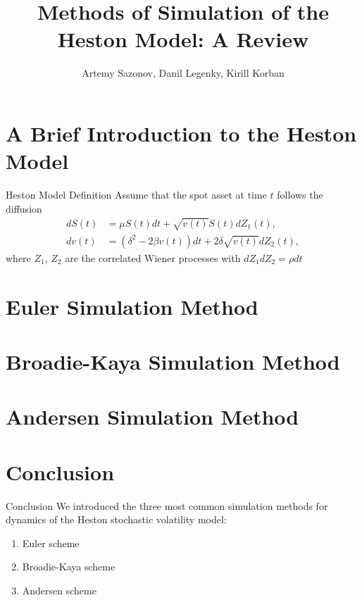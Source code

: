 \documentclass{vegapresentation}
\title{Methods of Simulation of the Heston Model: A Review}
\author{Artemy Sazonov, Danil Legenky, Kirill Korban}
\institute{Lomonosov Moscow State Univesity, Faculty of Mechanics and Mathematics}
\begin{document}
    \begin{frame}
        \maketitle
    \end{frame}

    \section{A Brief Introduction to the Heston Model}
        \begin{frame}{Heston Model Definition}
            Assume that the spot asset at time $t$ follows the diffusion
            \begin{align}
                dS(t) & = \mu S(t)dt + \sqrt{v(t)} S(t) dZ_1(t), \label{Heston:price}\\
                dv(t) & = \left(\delta^2 - 2\beta v(t)\right) dt + 2\delta \sqrt{v(t)} dZ_2(t), \label{Heston:variance}
            \end{align}
            where $Z_1$, $Z_2$ are the correlated Wiener processes with $dZ_1dZ_2 = \rho dt$
        \end{frame}

    \section{Euler Simulation Method}
        

    \section{Broadie-Kaya Simulation Method} 
        

    \section{Andersen Simulation Method}
        

    \section{Conclusion}
        \begin{frame}{Conclusion}
            We introduced the three most common simulation methods for dynamics of the Heston stochastic volatility model:
            \begin{enumerate}
                \item Euler scheme \\
                \item Broadie-Kaya scheme \\
                \item Andersen scheme
            \end{enumerate}
        \end{frame}
\end{document}
